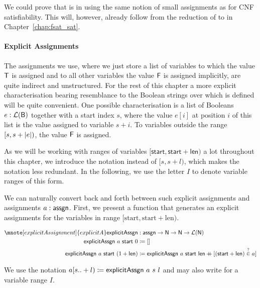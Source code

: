 We could prove that \fsat{} is in \NP{} using the same notion of small assignments as for CNF satisfiability. This will, however, already follow from the reduction of \fsat{} to \SAT{} in Chapter~\ref{chap:fsat_sat}. 

\paragraph{Explicit Assignments}
The assignments we use, where we just store a list of variables to which the value $\mathsf{T}$ is assigned and to all other variables the value $\mathsf{F}$ is assigned implicitly, are quite indirect and unstructured. 
For the rest of this chapter a more explicit characterisation bearing resemblance to the Boolean strings over which \BPR{} is defined will be quite convenient.
One possible characterisation is a list of Booleans $e : \mathcal{L} (\textsf{B})$ together with a start index $s$, where the value $e[i]$ at position $i$ of this list is the value assigned to variable $s + i$. To variables outside the range $[s, s+|e|)$, the value $\mathsf{F}$ is assigned.

As we will be working with ranges of variables $[\textsf{start}, \textsf{start} + \textsf{len})$ a lot throughout this chapter, we introduce the notation \mnotec{$[s .. +l)$} instead of $[s, s+l)$, which makes the notation less redundant. In the following, we use the letter $I$ to denote variable ranges of this form.

We can naturally convert back and forth between such explicit assignments and assignments $a : \textsf{assgn}$.
First, we present a function that generates an explicit assignments for the variables in range $[\text{start}, \text{start} + \text{len})$. 

\newcommand{\explicitA}{\textsf{explicitAssgn}}
\begin{align*}
  \mnote[explicitAssignment]{explicitA}\explicitA &: \assgn \rightarrow \nat \rightarrow \nat \rightarrow \listsof{\nat} \\
  \explicitA~a~\textsf{start}~0 &\defeq \nil \\
  \explicitA~a~\textsf{start}~(\natS{\textsf{len}}) &\defeq \explicitA~a~\textsf{start}~\textsf{len} \concat [(\textsf{start} + \textsf{len}) \overset{?}{\in} a]
\end{align*}

We use the notation $a[s ..+l) \defeq \explicitA~a~s~l$ and may also write  for a variable range $I$.

